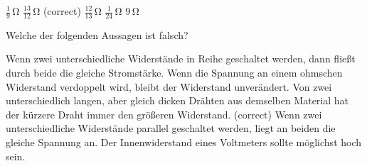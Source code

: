 \documentclass[11pt]{exam}
\begin{document}
\begin{questions}
\begin{choices}
	\choice \(\mathrm{\frac{1}{9}\,\Omega}\)
	\choice \(\mathrm{\frac{13}{12}\,\Omega}\) (correct)
	\choice \(\mathrm{\frac{12}{13}\,\Omega}\)
	\choice \(\mathrm{\frac{1}{24}\,\Omega}\)
	\choice \(\mathrm{9\,\Omega}\)
\end{choices}

\vspace{3mm}\question Welche der folgenden Aussagen ist falsch?

\begin{choices}
	\choice Wenn zwei unterschiedliche Widerstände in Reihe geschaltet werden, dann fließt durch beide die gleiche Stromstärke.
	\choice Wenn die Spannung an einem ohmschen Widerstand verdoppelt wird, bleibt der Widerstand unverändert.
	\choice Von zwei unterschiedlich langen, aber gleich dicken Drähten aus demselben Material hat der kürzere Draht immer den größeren Widerstand. (correct)
	\choice Wenn zwei unterschiedliche Widerstände parallel geschaltet werden, liegt an beiden die gleiche Spannung an.
	\choice Der Innenwiderstand eines Voltmeters sollte möglichst hoch sein.
\end{choices}

\vspace{3mm}\end{questions}
\end{document}
